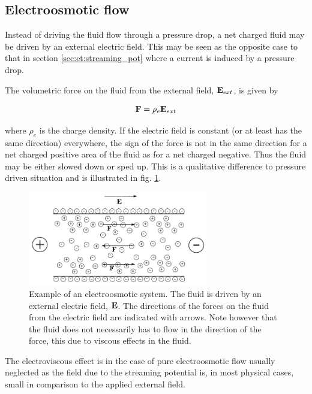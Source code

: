 \subsection{Electroosmotic flow}\label{sec:et:electroosmosis}
Instead of driving the fluid flow through a pressure drop, a net
charged fluid may be driven by an external electric field. This may
be seen as the opposite case to that in section
\ref{sec:et:streaming_pot} where a current is induced by a pressure
drop.

The volumetric force on the fluid from the external field, $\mathbf{E}_{ext}$,
is given by

\begin{equation}
\mathbf{F} = \mathrm{\rho}_e \mathbf{E}_{ext}
\end{equation}

where $\rho_e$ is the charge density. If the electric field is
constant (or at least has the same direction) everywhere, the sign of
the force is not in the same direction for a net charged positive area
of the fluid as for a net charged negative. Thus the fluid may be
either slowed down or sped up. This is a qualitative difference to
pressure driven situation and is illustrated in fig. \ref{fig:et:eo}.

\begin{figure}
\begin{center}
\includegraphics[width=0.7\textwidth]{fig/channel_electroosmosis.pdf}
\end{center}
\caption[Example of an electroosmotic system.]{Example of an
  electroosmotic system. The fluid is driven by an external electric
  field, $\mathbf{E}$. The directions of the forces on the fluid from the
  electric field are indicated with arrows. Note however that the
  fluid does not necessarily has to flow in the direction of the
  force, this due to viscous effects in the fluid. }
\label{fig:et:eo}
\end{figure}

The electroviscous effect is in the case of pure electroosmotic flow
usually neglected as the field due to the streaming potential is, in
most physical cases, small in comparison to the applied external
field. \cite{wang-poi}
